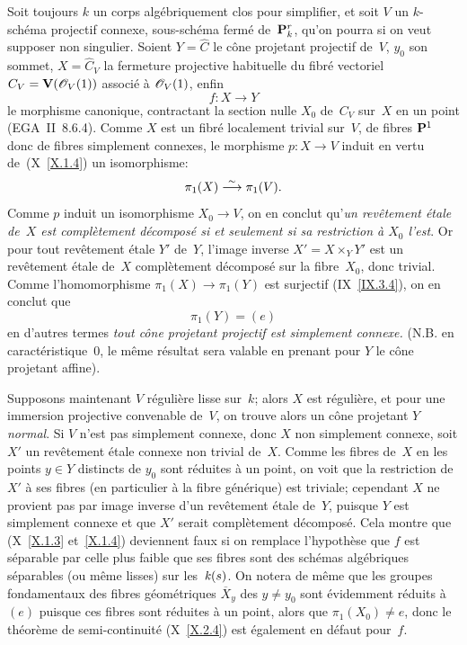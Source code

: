 Soit toujours $k$ un corps alg\'ebriquement clos pour simplifier, et
soit $V$ un $k$-sch\'ema projectif connexe, sous-sch\'ema
ferm\'e de~$\mathbf{P}^r_k$, qu'on pourra si on veut supposer non
singulier. Soient $Y=\hat C$ le c\^one projetant projectif de~$V$,
$y_0$ son sommet, $X=\hat C_V$ la fermeture projective habituelle du
fibr\'e vectoriel $C_V=\VV(\cal{O}_V(1))$ associ\'e \`a
$\cal{O}_V(1)$, enfin
$$
f\colon X\to Y
$$
le morphisme canonique, contractant la section nulle $X_0$ de~$C_V$
sur~$X$ en un point (EGA~II~8.6.4). Comme $X$ est un fibr\'e
localement trivial sur~$V$, de fibres $\mathbf{P}^1$ donc de fibres
simplement connexes, le morphisme $p\colon X\to V$ induit en vertu
de~(X~\ref{X.1.4})
un isomorphisme:
$$
\pi_1(X)\overset{\sim}{\longrightarrow}\pi_1(V).
$$
Comme $p$ induit un isomorphisme $X_0\to V$, on en conclut qu'\emph{un
revêtement étale de~$X$ est complètement décomposé
si et seulement si sa restriction à $X_0$ l'est}. Or pour tout
rev\^etement \'etale $Y'$ de~$Y$, l'image inverse $X'=X\times_Y
Y'$ est un rev\^etement \'etale de~$X$ compl\`etement
d\'ecompos\'e sur la fibre~$X_0$, donc trivial. Comme
l'homomorphisme $\pi_1(X)\to\pi_1(Y)$ est surjectif (IX~\ref{IX.3.4}),
on en conclut que
$$
\pi_1(Y)=(e)
$$
en d'autres termes \emph{tout cône projetant projectif est
simplement connexe.} (N.B. en ca\-rac\-t\'e\-ris\-tique~$0$, le
m\^eme r\'esultat sera valable en prenant pour $Y$ le c\^one
projetant affine).

Supposons maintenant $V$ r\'eguli\`ere \ie lisse sur~$k$; alors
$X$ est r\'eguli\`ere, et pour une immersion projective convenable
de~$V$, on trouve alors un c\^one projetant $Y$ \emph{normal}. Si
$V$ n'est pas simplement connexe, donc $X$ non simplement connexe,
soit $X'$ un rev\^etement \'etale connexe non trivial
de~$X$. Comme les fibres de~$X$ en les points $y\in Y$ distincts de
$y_0$ sont r\'eduites \`a un point, on voit que la restriction de
$X'$ \`a ses fibres (en particulier \`a la
fibre
g\'en\'erique) est triviale; cependant $X$ ne provient pas par
image inverse d'un rev\^etement \'etale de~$Y$, puisque $Y$ est
simplement connexe et que $X'$ serait compl\`etement
d\'ecompos\'e. Cela montre que (X~\ref{X.1.3} et~\ref{X.1.4})
deviennent faux si on remplace l'hypoth\`ese que $f$ est
s\'eparable par celle plus faible que ses fibres sont des
sch\'emas alg\'ebriques s\'eparables (ou m\^eme lisses) sur
les~$\mathit{k}(s)$. On notera de m\^eme que les groupes fondamentaux des
fibres g\'eom\'etriques $\overline X_y$ des $y\neq y_0$ sont
\'evidemment r\'eduits \`a $(e)$ puisque ces fibres sont
r\'eduites \`a un point, alors que $\pi_1(X_0)\neq e$, donc le
th\'eor\`eme de semi-continuit\'e (X~\ref{X.2.4}) est
\'egalement en d\'efaut pour~$f$.

